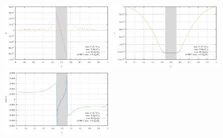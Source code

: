 \begin{center}
\includegraphics[width=5.6cm]{images/sinking_block/u_NS}
\includegraphics[width=5.6cm]{images/sinking_block/v_NS}
\includegraphics[width=5.6cm]{images/sinking_block/pressure_NS}
\end{center}








